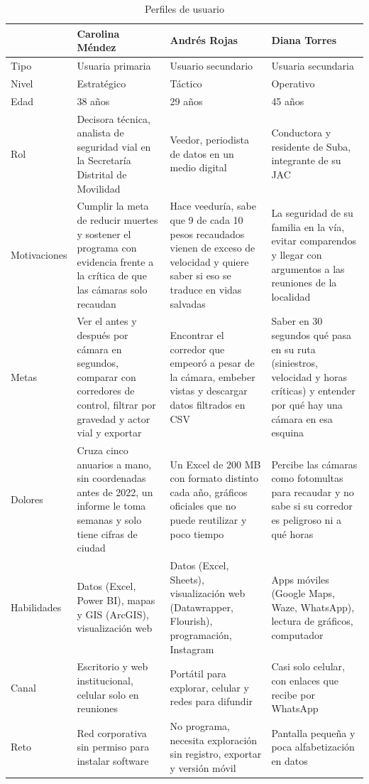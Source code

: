 \documentclass[10pt,a4paper]{article}
\begin{document}
\begin{table}[H]\centering\footnotesize
\begin{tabularx}{\linewidth}{P{2.3cm}LLL}
\toprule
 & \textbf{Carolina Méndez} & \textbf{Andrés Rojas} & \textbf{Diana Torres}\\
\midrule
Tipo & Usuaria primaria & Usuario secundario & Usuaria secundaria\\
Nivel & Estratégico & Táctico & Operativo\\
Edad & 38 años & 29 años & 45 años\\
Rol & Decisora técnica, analista de seguridad vial en la Secretaría Distrital de Movilidad & Veedor, periodista de datos en un medio digital & Conductora y residente de Suba, integrante de su JAC\\
Motivaciones & Cumplir la meta de reducir muertes y sostener el programa con evidencia frente a la crítica de que las cámaras solo recaudan & Hace veeduría, sabe que 9 de cada 10 pesos recaudados vienen de exceso de velocidad y quiere saber si eso se traduce en vidas salvadas & La seguridad de su familia en la vía, evitar comparendos y llegar con argumentos a las reuniones de la localidad\\
Metas & Ver el antes y después por cámara en segundos, comparar con corredores de control, filtrar por gravedad y actor vial y exportar & Encontrar el corredor que empeoró a pesar de la cámara, embeber vistas y descargar datos filtrados en CSV & Saber en 30 segundos qué pasa en su ruta (siniestros, velocidad y horas críticas) y entender por qué hay una cámara en esa esquina\\
Dolores & Cruza cinco anuarios a mano, sin coordenadas antes de 2022, un informe le toma semanas y solo tiene cifras de ciudad & Un Excel de 200 MB con formato distinto cada año, gráficos oficiales que no puede reutilizar y poco tiempo & Percibe las cámaras como fotomultas para recaudar y no sabe si su corredor es peligroso ni a qué horas\\
Habilidades & Datos (Excel, Power BI), mapas y GIS (ArcGIS), visualización web & Datos (Excel, Sheets), visualización web (Datawrapper, Flourish), programación, Instagram & Apps móviles (Google Maps, Waze, WhatsApp), lectura de gráficos, computador\\
Canal & Escritorio y web institucional, celular solo en reuniones & Portátil para explorar, celular y redes para difundir & Casi solo celular, con enlaces que recibe por WhatsApp\\
Reto & Red corporativa sin permiso para instalar software & No programa, necesita exploración sin registro, exportar y versión móvil & Pantalla pequeña y poca alfabetización en datos\\
\bottomrule
\end{tabularx}
\caption{Perfiles de usuario}
\end{table}
\end{document}
